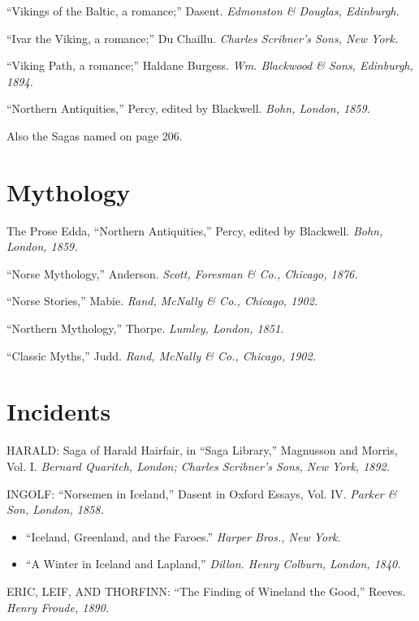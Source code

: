 \noindent ``Vikings of the Baltic, a romance;'' Dasent. \emph{Edmonston
\& Douglas, Edinburgh.}

\noindent ``Ivar the Viking, a romance;'' Du Chaillu. \emph{Charles
Scribner's Sons, New York.}

\noindent ``Viking Path, a romance;'' Haldane Burgess. \emph{Wm.
Blackwood \& Sons, Edinburgh, 1894.}

\noindent ``Northern Antiquities,'' Percy, edited by Blackwell.
\emph{Bohn, London, 1859.}

\noindent Also the Sagas named on page 206.

\section*{Mythology}

The Prose Edda, ``Northern Antiquities,'' Percy, edited by Blackwell.
\emph{Bohn, London, 1859.}

\noindent ``Norse Mythology,'' Anderson. \emph{Scott, Foresman \& Co.,
Chicago, 1876.}

\noindent ``Norse Stories,'' Mabie. \emph{Rand, McNally \& Co., Chicago,
1902.}

\noindent ``Northern Mythology,'' Thorpe. \emph{Lumley, London, 1851.}

\noindent ``Classic Myths,'' Judd. \emph{Rand, McNally \& Co., Chicago,
1902.}

\section*{Incidents}

HARALD: Saga of Harald Hairfair, in ``Saga Library,'' Magnusson and
Morris, Vol. I. \emph{Bernard Quaritch, London; Charles Scribner's Sons,
New York, 1892.}

\noindent INGOLF: ``Norsemen in Iceland,'' Dasent in Oxford Essays, Vol.
IV. \emph{Parker \& Son, London, 1858.}

\begin{itemize}[itemsep=0pt]
\item ``Iceland, Greenland, and the Faroes.'' \emph{Harper Bros., New York.}
\item ``A Winter in Iceland and Lapland,'' \emph{Dillon. Henry Colburn, London,
1840.}
\end{itemize}

\noindent ERIC, LEIF, AND THORFINN: ``The Finding of Wineland the Good,''
Reeves. \emph{Henry Froude, 1890.}

